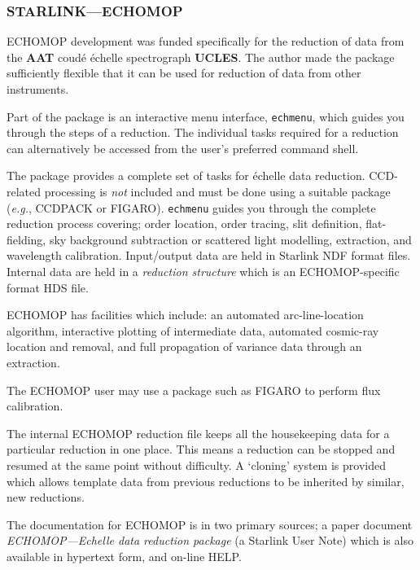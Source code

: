 \documentclass[twoside,11pt]{article}
\newcommand{\htmlref}[2]{#1}
\newcommand{\xref}[3]{#1}
\newcommand{\xlabel}[1]{}
\newcommand{\sgspec}[2]{#1}
\newcommand{\sgspec}[2]{#2}
\begin{document}
\subsubsection{\xlabel{echomop}\label{se_echomop}STARLINK\sgspec{---}{ - }ECHOMOP}

ECHOMOP development was funded specifically for the reduction of data from
the \htmlref{{\bf AAT}}{gl_aao_aat} coud\'{e} \'{e}chelle spectrograph
\htmlref{{\bf UCLES}}{gl_ucles}\@.
The author made the package sufficiently flexible that it can be used for
reduction of data from other instruments.

Part of the package is an interactive menu interface, {\tt echmenu}, which
guides you through the steps of a reduction.  The individual tasks
required for a reduction can alternatively be accessed from the user's
preferred command shell.

The package provides a complete set of tasks for \'{e}chelle data
reduction.  CCD-related processing is {\em not} included and must be done
using a suitable package ({\em{e.g.}}, \xref{CCDPACK}{sun139}{} or
\xref{FIGARO}{sun86}{})\@.  {\tt echmenu} guides you
through the complete reduction process covering; order location,
order tracing, slit definition, flat-fielding, sky background subtraction or
scattered light modelling, extraction, and wavelength calibration.
Input/output data are held in \xref{Starlink NDF format}{sun33}{} files.
Internal data are held in a {\em reduction structure} which is an
ECHOMOP-specific format HDS file.

ECHOMOP has facilities which include: an automated arc-line-location
algorithm, interactive plotting of intermediate data, automated cosmic-ray
location and removal, and full propagation of variance data through an
extraction.

The ECHOMOP user may use a package such as FIGARO to perform flux
calibration.

The internal ECHOMOP reduction file keeps all the housekeeping data for a
particular reduction in one place.  This means a reduction can be stopped
and resumed at the same point without difficulty.  A `cloning' system is
provided which allows template data from previous reductions to be
inherited by similar, new reductions.

The documentation for ECHOMOP is in two primary sources; a paper
document \xref{{\sl ECHOMOP\sgspec{---}{ - }Echelle data reduction package}}
{sun152}{}
(a Starlink User Note) which is also available in hypertext form,
and on-line HELP\@.
\end{document}

